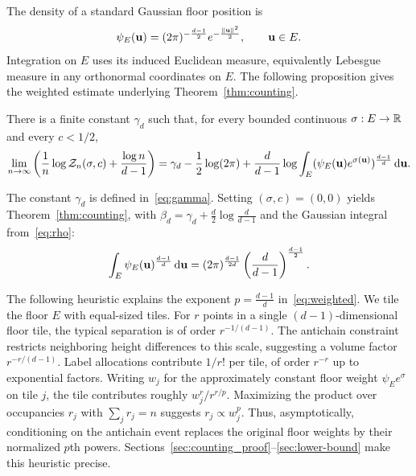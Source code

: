 \documentclass[11pt,letterpaper]{article}
\begin{document}
The density of a standard Gaussian floor position is
\begin{equation}\label{eq:rho}
      \psi_E(\mathbf u) =(2\pi)^{-\frac{d-1}{2}}e^{-\frac{\|\mathbf u\|^2}{2}},\qquad \mathbf u\in E.
\end{equation}
Integration on $E$ uses its induced Euclidean measure, equivalently Lebesgue measure in any orthonormal coordinates on $E$. The following proposition gives the weighted estimate underlying Theorem~\ref{thm:counting}.

\begin{proposition}\label{prop:volume}\label{thm:volume}
      There is a finite constant $\gamma_d$ such that, for every bounded continuous $\sigma:E\to\mathbb R$ and every $c<1/2$,
      \begin{equation}\label{eq:weighted}
            \lim_{n\to\infty}\left(\frac1n\log\mathcal Z_n(\sigma,c)+\frac{\log n}{d-1}\right) =\gamma_d-\frac12\log(2\pi)+\frac d{d-1}\log\int_E(\psi_E(\mathbf u)e^{\sigma(\mathbf u)})^{\frac{d-1}d}\,\mathrm d\mathbf u.
      \end{equation}
\end{proposition}


\begin{remark}\label{rem:proof-thm-1}
      The constant $\gamma_d$ is defined in~\eqref{eq:gamma}. Setting $(\sigma,c)=(0,0)$ yields Theorem~\ref{thm:counting}, with $\beta_d=\gamma_d+\frac d2\log\frac d{d-1}$ and the Gaussian integral from~\eqref{eq:rho}:
      \[
            \int_E\psi_E(\mathbf u)^{\frac{d-1}{d}}\,\mathrm d\mathbf u
            =(2\pi)^{\frac{d-1}{2d}}
            \left(\frac d{d-1}\right)^{\frac{d-1}{2}}.
      \]
\end{remark}
\begin{remark}
      The following heuristic explains the exponent $p=\frac{d-1}{d}$ in~\eqref{eq:weighted}. We tile the floor $E$ with equal-sized tiles. For $r$ points in a single $(d-1)$-dimensional floor tile, the typical separation is of order $r^{-1/(d-1)}$. The antichain constraint restricts neighboring height differences to this scale, suggesting a volume factor $r^{-r/(d-1)}$. Label allocations contribute $1/r!$ per tile, of order $r^{-r}$ up to exponential factors. Writing $w_j$ for the approximately constant floor weight $\psi_E e^\sigma$ on tile $j$, the tile contributes roughly $w_j^r/r^{r/p}$. Maximizing the product over occupancies $r_j$ with $\sum_jr_j=n$ suggests $r_j\propto w_j^p$. Thus, asymptotically, conditioning on the antichain event replaces the original floor weights by their normalized $p$th powers. Sections~\ref{sec:counting_proof}--\ref{sec:lower-bound} make this heuristic precise.
\end{remark}
\end{document}
